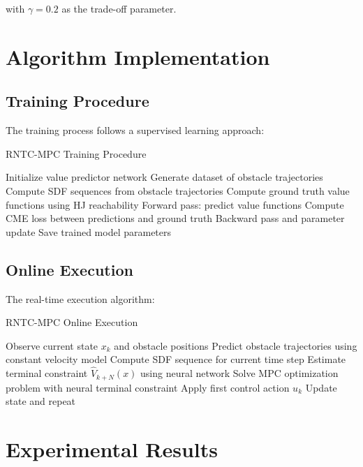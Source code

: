\documentclass[12pt,a4paper]{article}
\begin{document}
with $\gamma = 0.2$ as the trade-off parameter.

\section{Algorithm Implementation}

\subsection{Training Procedure}
The training process follows a supervised learning approach:

\begin{algorithm}
\caption{RNTC-MPC Training Procedure}
\begin{algorithmic}[1]
\State Initialize value predictor network
\State Generate dataset of obstacle trajectories
        \State Compute SDF sequences from obstacle trajectories
        \State Compute ground truth value functions using HJ reachability
        \State Forward pass: predict value functions
        \State Compute CME loss between predictions and ground truth
        \State Backward pass and parameter update
    \EndFor
\EndFor
\State Save trained model parameters
\end{algorithmic}
\end{algorithm}

\subsection{Online Execution}
The real-time execution algorithm:

\begin{algorithm}
\caption{RNTC-MPC Online Execution}
\begin{algorithmic}[1]
\State Observe current state $x_k$ and obstacle positions
\State Predict obstacle trajectories using constant velocity model
\State Compute SDF sequence for current time step
\State Estimate terminal constraint $\hat{V}_{k+N}(x)$ using neural network
\State Solve MPC optimization problem with neural terminal constraint
\State Apply first control action $u_k$
\State Update state and repeat
\end{algorithmic}
\end{algorithm}

\section{Experimental Results}
\end{document}

